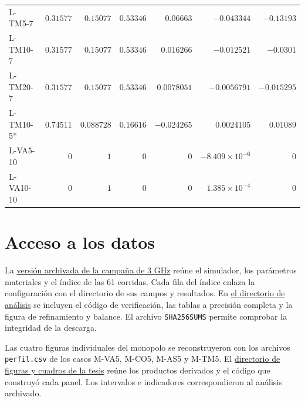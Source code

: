 \begin{longtable}{lrrrrrr}
L-TM5-7 & $0.31577$ & $0.15077$ & $0.53346$ & $0.06663$ & $-0.043344$ & $-0.13193$ \\
L-TM10-7 & $0.31577$ & $0.15077$ & $0.53346$ & $0.016266$ & $-0.012521$ & $-0.0301$ \\
L-TM20-7 & $0.31577$ & $0.15077$ & $0.53346$ & $0.0078051$ & $-0.0056791$ & $-0.015295$ \\
L-TM10-5* & $0.74511$ & $0.088728$ & $0.16616$ & $-0.024265$ & $0.0024105$ & $0.01089$ \\
L-VA5-10 & $0$ & $1$ & $0$ & $0$ & $-8.409\times 10^{-6}$ & $0$ \\
L-VA10-10 & $0$ & $1$ & $0$ & $0$ & $1.385\times 10^{-4}$ & $0$ \\
\hline\end{longtable}\endgroup
\section{Acceso a los datos}
La \href{https://github.com/JavierMencos/Resultados-de-Tesis/tree/dcbbe9551d1a23f3a738add5e25c5f818cc6d5c8/Tesis_Resultados/Campana_Referencias_20261107}{versión archivada de la campaña de 3 GHz} reúne el simulador, los parámetros materiales y el índice de las 61 corridas. Cada fila del índice enlaza la configuración con el directorio de sus campos y resultados. En \href{https://github.com/JavierMencos/Resultados-de-Tesis/tree/dcbbe9551d1a23f3a738add5e25c5f818cc6d5c8/Tesis_Resultados/Campana_Referencias_20261107/analisis}{el directorio de análisis} se incluyen el código de verificación, las tablas a precisión completa y la figura de refinamiento y balance. El archivo \texttt{SHA256SUMS} permite comprobar la integridad de la descarga.

Las cuatro figuras individuales del monopolo se reconstruyeron con los archivos \texttt{perfil.csv} de los casos M-VA5, M-CO5, M-AS5 y M-TM5. El \href{https://github.com/JavierMencos/Resultados-de-Tesis/tree/b8ee28cf5d8daf4581a7a21eaf64c158f3c0615e/Tesis_Resultados/Tesis_61_corridas}{directorio de figuras y cuadros de la tesis} reúne los productos derivados y el código que construyó cada panel. Los intervalos e indicadores correspondieron al análisis archivado.

